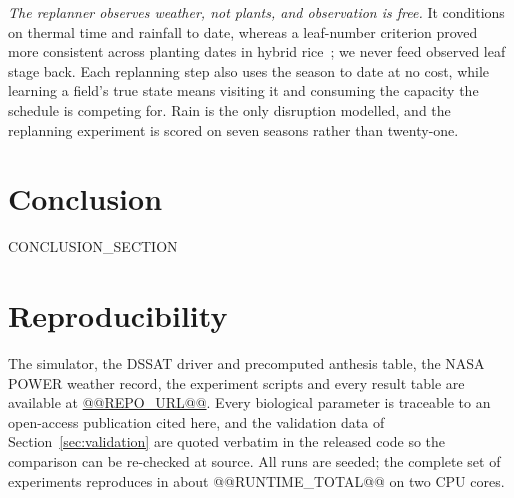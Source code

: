 \documentclass[10pt,twocolumn]{article}
\begin{document}
\emph{The replanner observes weather, not plants, and observation is free.}
It conditions on thermal time and rainfall to date, whereas a leaf-number
criterion proved more consistent across planting dates in hybrid
rice~\cite{varma2018}; we never feed observed leaf stage back. Each
replanning step also uses the season to date at no cost, while learning a
field's true state means visiting it and consuming the capacity the
schedule is competing for. Rain is the only disruption modelled, and the
replanning experiment is scored on seven seasons rather than
twenty-one.

\section{Conclusion}

CONCLUSION_SECTION

\section{Reproducibility}
The simulator, the DSSAT driver and precomputed anthesis table, the NASA
POWER weather record, the experiment scripts and every result table are
available at \url{@@REPO_URL@@}. Every biological parameter is traceable to
an open-access publication cited here, and the validation data of
Section~\ref{sec:validation} are quoted verbatim in the released code so
the comparison can be re-checked at source. All runs are seeded; the
complete set of experiments reproduces in about @@RUNTIME_TOTAL@@ on two
CPU cores.
\end{document}
